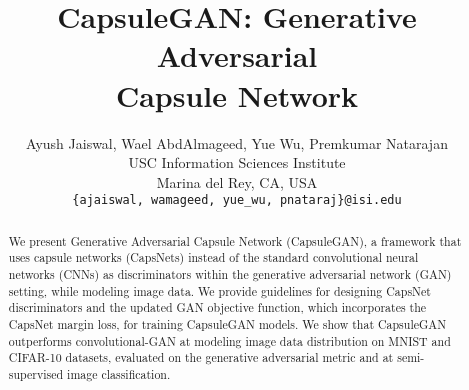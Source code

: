 \documentclass{article}
\begin{document}
\title{CapsuleGAN: Generative Adversarial \\Capsule Network}

\author{
Ayush Jaiswal, Wael AbdAlmageed, Yue Wu, Premkumar Natarajan\\
USC Information Sciences Institute\\
Marina del Rey, CA, USA\\
{\tt\small \{ajaiswal, wamageed, yue\_wu, pnataraj\}@isi.edu}
}

\maketitle

\begin{abstract}

We present Generative Adversarial Capsule Network (CapsuleGAN), a framework that uses capsule networks (CapsNets) instead of the standard convolutional neural networks (CNNs) as discriminators within the generative adversarial network (GAN) setting, while modeling image data. We provide guidelines for designing CapsNet discriminators and the updated GAN objective function, which incorporates the CapsNet margin loss, for training CapsuleGAN models. We show that CapsuleGAN outperforms convolutional-GAN at modeling image data distribution on MNIST and CIFAR-10 datasets, evaluated on the generative adversarial metric and at semi-supervised image classification.
   
\end{abstract}



















{\small


}
\end{document}

